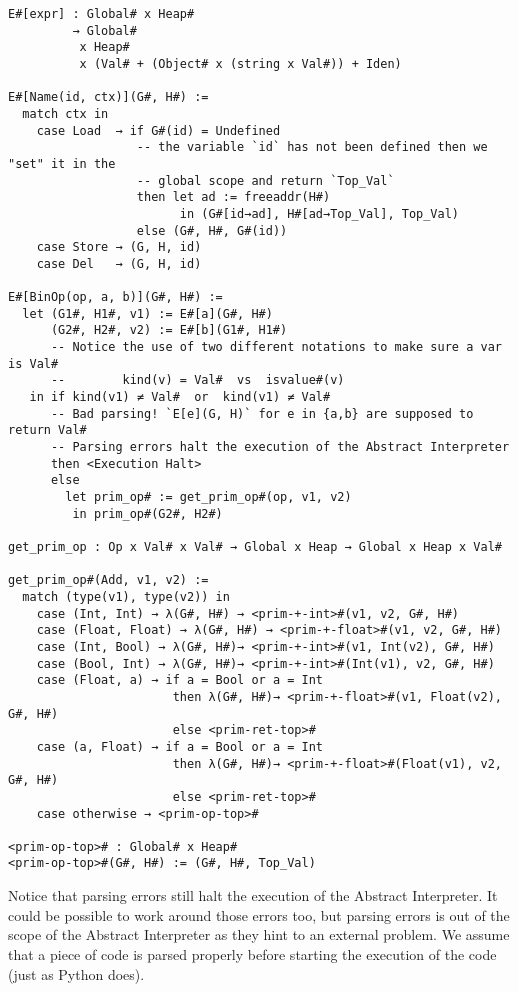 \begin{verbatim}
E#[expr] : Global# x Heap#
         → Global#
          x Heap#
          x (Val# + (Object# x (string x Val#)) + Iden)

E#[Name(id, ctx)](G#, H#) :=
  match ctx in
    case Load  → if G#(id) = Undefined
                  -- the variable `id` has not been defined then we "set" it in the
                  -- global scope and return `Top_Val`
                  then let ad := freeaddr(H#)
                        in (G#[id→ad], H#[ad→Top_Val], Top_Val)
                  else (G#, H#, G#(id))
    case Store → (G, H, id)
    case Del   → (G, H, id)

E#[BinOp(op, a, b)](G#, H#) :=
  let (G1#, H1#, v1) := E#[a](G#, H#)
      (G2#, H2#, v2) := E#[b](G1#, H1#)
      -- Notice the use of two different notations to make sure a var is Val#
      --        kind(v) = Val#  vs  isvalue#(v)
   in if kind(v1) ≠ Val#  or  kind(v1) ≠ Val#
      -- Bad parsing! `E[e](G, H)` for e in {a,b} are supposed to return Val#
      -- Parsing errors halt the execution of the Abstract Interpreter
      then <Execution Halt>
      else
        let prim_op# := get_prim_op#(op, v1, v2)
         in prim_op#(G2#, H2#)

get_prim_op : Op x Val# x Val# → Global x Heap → Global x Heap x Val#

get_prim_op#(Add, v1, v2) :=
  match (type(v1), type(v2)) in
    case (Int, Int) → λ(G#, H#) → <prim-+-int>#(v1, v2, G#, H#)
    case (Float, Float) → λ(G#, H#) → <prim-+-float>#(v1, v2, G#, H#)
    case (Int, Bool) → λ(G#, H#)→ <prim-+-int>#(v1, Int(v2), G#, H#)
    case (Bool, Int) → λ(G#, H#)→ <prim-+-int>#(Int(v1), v2, G#, H#)
    case (Float, a) → if a = Bool or a = Int
                       then λ(G#, H#)→ <prim-+-float>#(v1, Float(v2), G#, H#)
                       else <prim-ret-top>#
    case (a, Float) → if a = Bool or a = Int
                       then λ(G#, H#)→ <prim-+-float>#(Float(v1), v2, G#, H#)
                       else <prim-ret-top>#
    case otherwise → <prim-op-top>#

<prim-op-top># : Global# x Heap#
<prim-op-top>#(G#, H#) := (G#, H#, Top_Val)
\end{verbatim}

Notice that parsing errors still halt the execution of the Abstract
Interpreter. It could be possible to work around those errors too, but
parsing errors is out of the scope of the Abstract Interpreter as they hint
to an external problem. We assume that a piece of code is parsed
properly before starting the execution of the code (just as Python
does).

